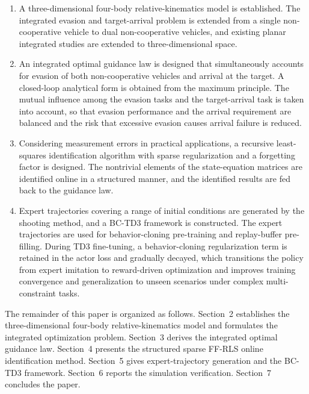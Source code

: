 \begin{enumerate}
\item A three-dimensional four-body relative-kinematics model is established. The integrated evasion and target-arrival problem is extended from a single non-cooperative vehicle to dual non-cooperative vehicles, and existing planar integrated studies are extended to three-dimensional space.
\item An integrated optimal guidance law is designed that simultaneously accounts for evasion of both non-cooperative vehicles and arrival at the target. A closed-loop analytical form is obtained from the maximum principle. The mutual influence among the evasion tasks and the target-arrival task is taken into account, so that evasion performance and the arrival requirement are balanced and the risk that excessive evasion causes arrival failure is reduced.
\item Considering measurement errors in practical applications, a recursive least-squares identification algorithm with sparse regularization and a forgetting factor is designed. The nontrivial elements of the state-equation matrices are identified online in a structured manner, and the identified results are fed back to the guidance law.
\item Expert trajectories covering a range of initial conditions are generated by the shooting method, and a BC-TD3 framework is constructed. The expert trajectories are used for behavior-cloning pre-training and replay-buffer pre-filling. During TD3 fine-tuning, a behavior-cloning regularization term is retained in the actor loss and gradually decayed, which transitions the policy from expert imitation to reward-driven optimization and improves training convergence and generalization to unseen scenarios under complex multi-constraint tasks.
\end{enumerate}

The remainder of this paper is organized as follows. Section~2 establishes the three-dimensional four-body relative-kinematics model and formulates the integrated optimization problem. Section~3 derives the integrated optimal guidance law. Section~4 presents the structured sparse FF-RLS online identification method. Section~5 gives expert-trajectory generation and the BC-TD3 framework. Section~6 reports the simulation verification. Section~7 concludes the paper.
